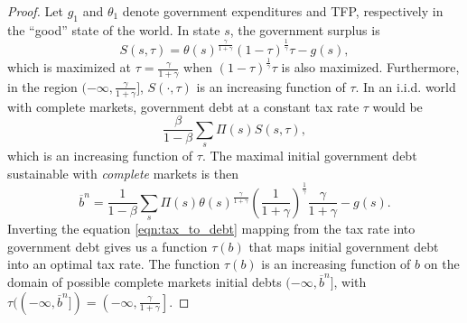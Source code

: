 \documentclass[12pt]{article}
\begin{document}
\begin{proof}  Let $g_1$ and $\theta_1$ denote  government expenditures and TFP, respectively in the ``good'' state of the world.
 In state $s$, the government surplus is
\[
	S(s,\tau) = \theta(s)^\frac\gamma{1+\gamma}(1-\tau)^\frac1\gamma\tau - g(s),
\]  which  is  maximized at $\tau = \frac\gamma{1+\gamma}$ when $(1-\tau)^\frac1\gamma\tau$ is also maximized. Furthermore, in the region $(-\infty,\frac\gamma{1+\gamma}]$, $S(\cdot,\tau)$ is an increasing function of $\tau$.  In an i.i.d. world with complete markets, government debt
at a constant tax rate $\tau$ would be
\begin{equation}\label{eqn:tax_to_debt}
	\frac\beta{1-\beta} \sum_s \Pi(s) S(s,\tau),
\end{equation}which is an increasing function of $\tau$.  The maximal initial government debt sustainable with {\em complete} markets is then
\[
	\overline b^n = \frac1{1-\beta} \sum_s \Pi(s)\theta(s)^\frac\gamma{1+\gamma}\left(\frac{1}{1+\gamma}\right)^\frac1\gamma\frac{\gamma}{1+\gamma} - g(s) .\] Inverting the equation \eqref{eqn:tax_to_debt} mapping   from the tax rate into government debt gives us a function $\tau(b)$ that maps initial government debt into an optimal tax rate. The function $\tau(b)$ is an increasing function of $b$ on the domain of possible complete markets initial debts $(-\infty,\overline b^n]$, with $\tau((-\infty,\overline{b}^n]) = \left(-\infty,\frac\gamma{1+\gamma}\right]$.



\end{proof}
\end{document}
